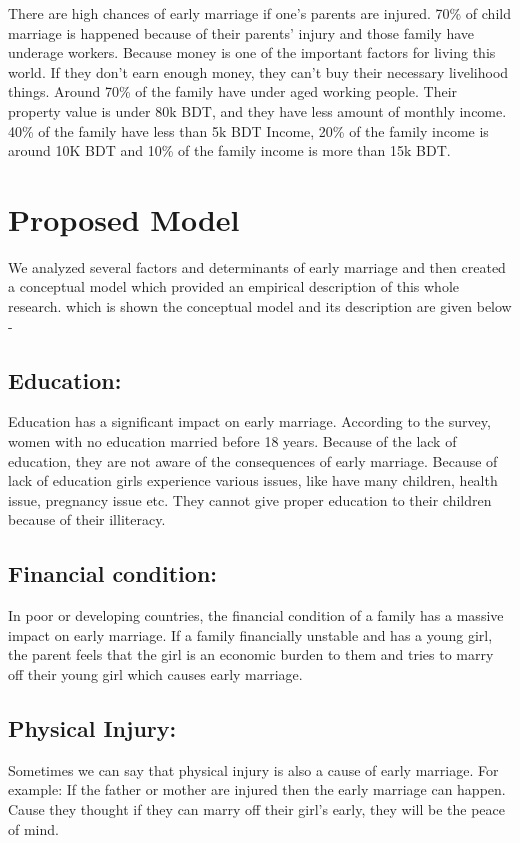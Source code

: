 \documentclass{article}
\begin{document}
        There are high chances of early marriage if one's parents are injured. 70\% of child marriage is happened because of their parents' injury and those family have underage workers. Because money is one of the important factors for living this world. If they don’t earn enough money, they can’t buy their necessary livelihood things. Around 70\% of the family have under aged working people. Their property value is under 80k BDT, and they have less amount of monthly income. 40\% of the family have less than 5k BDT Income, 20\% of the family income is around 10K BDT and 10\% of the family income is more than 15k BDT. 

\section{Proposed Model}
    We analyzed several factors and determinants of early marriage and then created a conceptual model which provided an empirical description of this whole research. which is shown the conceptual model and its description are given below - 
    \subsection{Education: }
        Education has a significant impact on early marriage. According to the survey, women with no education married before 18 years. Because of the lack of education, they are not aware of the consequences of early marriage. Because of lack of education girls experience various issues, like have many children, health issue, pregnancy issue etc. They cannot give proper education to their children because of their illiteracy. 
    \subsection{Financial condition: }
        In poor or developing countries, the financial condition of a family has a massive impact on early marriage. If a family financially unstable and has a young girl, the parent feels that the girl is an economic burden to them and tries to marry off their young girl which causes early marriage.
    \subsection{Physical Injury: }
        Sometimes we can say that physical injury is also a cause of early marriage. For example: If the father or mother are injured then the early marriage can happen. Cause they thought if they can marry off their girl's early, they will be the peace of mind. 
\end{document}
